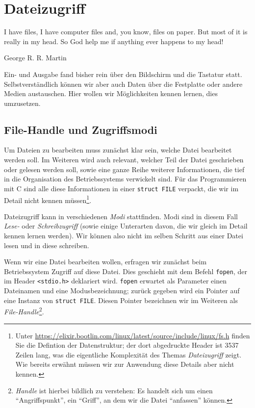 \chapter{Dateizugriff}
\epigraph{I have files, I have computer files and, you know, files on paper. But most of it is really in my head. So God help me if anything ever happens to my head!}{George R. R. Martin}

Ein- und Ausgabe fand bisher rein über den Bildschirm und die Tastatur statt. Selbstverständlich können wir aber auch Daten über die Festplatte oder andere Medien austauschen. Hier wollen wir Möglichkeiten kennen lernen, dies umzusetzen.

\section{File-Handle und Zugriffsmodi} \label{sec:fileAccess}
Um Dateien zu bearbeiten muss zunächst klar sein, welche Datei bearbeitet werden soll. Im Weiteren wird auch relevant, welcher Teil der Datei geschrieben oder gelesen werden soll, sowie eine ganze Reihe weiterer Informationen, die tief in die Organisation des Betriebssystems verwickelt sind. Für das Programmieren mit C sind alle diese Informationen in einer \texttt{struct FILE} verpackt, die wir im Detail nicht kennen müssen\footnote{Unter \url{https://elixir.bootlin.com/linux/latest/source/include/linux/fs.h} finden Sie die Defintion der Datenstruktur; der dort abgedruckte Header ist 3537 Zeilen lang, was die eigentliche Komplexität des Themas \emph{Dateizugriff} zeigt. Wie bereits erwähnt müssen wir zur Anwendung diese Details aber nicht kennen.}.

Dateizugriff kann in verschiedenen \emph{Modi} stattfinden. Modi sind in diesem Fall \emph{Lese-} oder \emph{Schreibzugriff} (sowie einige Unterarten davon, die wir gleich im Detail kennen lernen werden). Wir können also nicht im selben Schritt aus einer Datei lesen und in diese schreiben.

Wenn wir eine Datei bearbeiten wollen, erfragen wir zunächst beim Betriebssystem Zugriff auf diese Datei. Dies geschieht mit dem Befehl \texttt{fopen}, der im Header \texttt{<stdio.h>} deklariert wird. \texttt{fopen} erwartet als Parameter einen Dateinamen und eine Modusbezeichnung; zurück gegeben wird ein Pointer auf eine Instanz von \texttt{struct FILE}. Diesen Pointer bezeichnen wir im Weiteren als \emph{File-Handle}\footnote{\emph{Handle} ist hierbei bildlich zu verstehen: Es handelt sich um einen \enquote{Angriffspunkt}, ein \enquote{Griff}, an dem wir die Datei \enquote{anfassen} können.}.

